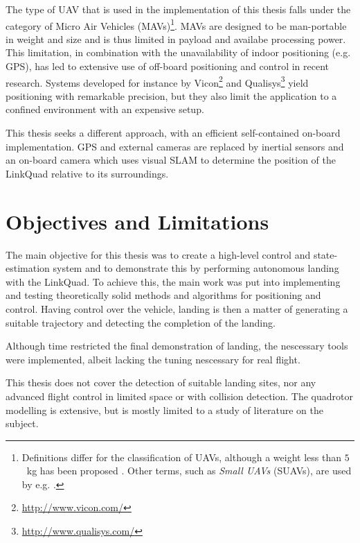     The type of UAV that is used in the implementation of this thesis
    falls under the category of Micro Air Vehicles (MAVs)\footnote{Definitions differ for the classification of UAVs,
    although a weight less than $5$~kg has been proposed \citep{arjomandi:classification}.
    Other terms, such as \textit{Small UAVs} (SUAVs), are used by e.g. \citep{valavanis2007advances}.}.
    MAVs are designed to be man-portable in weight and size and is thus
    limited in payload and availabe processing power.
    This limitation, in combination with the unavailability of indoor positioning (e.g. GPS),
    has led to extensive use of off-board positioning and control in recent research.
    Systems developed for instance by Vicon\footnote{\url{http://www.vicon.com/}} and
    Qualisys\footnote{\url{http://www.qualisys.com/}} yield positioning with
    remarkable precision, but they also limit the application to a confined
    environment with an expensive setup.

    This thesis seeks a different approach, with an efficient self-contained
    on-board implementation. GPS and external cameras are replaced by inertial sensors and an
    on-board camera which uses visual SLAM to determine the position of the LinkQuad relative to
    its surroundings.








\section{Objectives and Limitations}
    The main objective for this thesis was to create a high-level control and state-estimation
    system and to demonstrate this by performing autonomous landing with the LinkQuad.
    To achieve this, the main work was put into implementing and testing theoretically solid
    methods and algorithms for positioning and control.
    Having control over the vehicle, landing is then a matter of generating
    a suitable trajectory and detecting the completion of the landing.

    Although time restricted the final demonstration of landing, the nescessary tools
    were implemented, albeit lacking the tuning nescessary for real flight.

    This thesis does not cover the detection of suitable landing sites,
    nor any advanced flight control in limited space or with collision detection.
    The quadrotor modelling is extensive, but is mostly limited to a study
    of literature on the subject.

